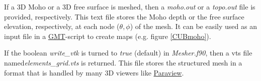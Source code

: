 If a 3D Moho or a 3D free surface is meshed, then a \textit{moho.out} or a \textit{topo.out} file is provided, respectively. This text file stores the Moho depth or the free surface elevation, respectively, at each node ($\theta,\phi$) of the mesh. It can be easily used as an input file in a \href{https://www.soest.hawaii.edu/gmt/}{GMT}-script to create maps (e.g. figure \ref{CUBmoho}).

If the boolean \textit{write\_vtk} is turned to \textit{true} (default) in \textit{Mesher.f90}, then a vts file named\textit{elements\_grid.vts} is returned. This file stores the structured mesh in a format that is handled by many 3D viewers like \href{https://www.paraview.org/}{Paraview}.